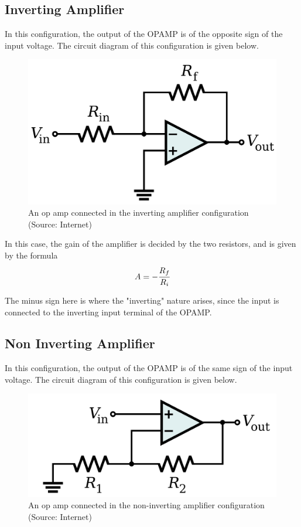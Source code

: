 \documentclass[10pt]{scrartcl}
\theoremstyle{definition}
\begin{document}
\subsection{Inverting Amplifier}
In this configuration, the output of the OPAMP is of the opposite sign of the input voltage.
The circuit diagram of this configuration is given below.

\begin{figure}[!h]
    \centering
    \includegraphics[width=0.6\linewidth]{invertingamp.png}
    \caption{An op amp connected in the inverting amplifier configuration (Source: Internet)}
\end{figure}

In this case, the gain of the amplifier is decided by the two resistors, and is given by the formula
$$A = -\cfrac{R_f}{R_i}$$

The minus sign here is where the "inverting" nature arises, since the input is connected to the inverting
input terminal of the OPAMP.

\subsection{Non Inverting Amplifier}
In this configuration, the output of the OPAMP is of the same sign of the input voltage.
The circuit diagram of this configuration is given below.

\begin{figure}[!h]
    \centering
    \includegraphics[width=0.6\linewidth]{noninvertingamp.png}
    \caption{An op amp connected in the non-inverting amplifier configuration (Source: Internet)}
\end{figure}
\end{document}
